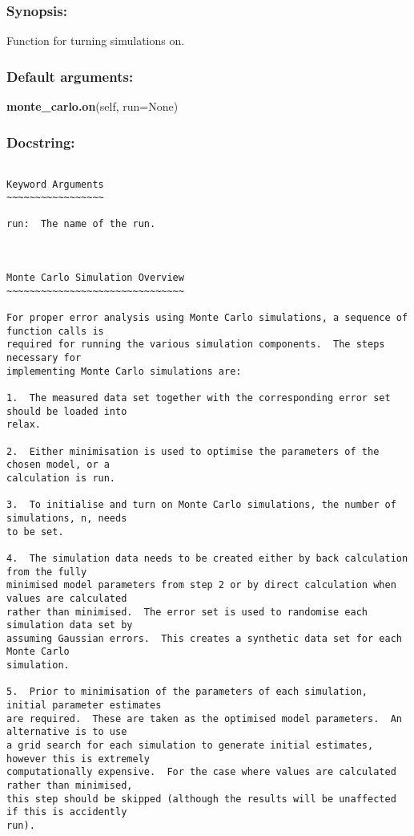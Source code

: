 \subsubsection{Synopsis:}

Function for turning simulations on.

\subsubsection{Default arguments:}

\textsf{\textbf{monte\_carlo.on}(self, run=None)
}


\subsubsection{Docstring:}

{\scriptsize
\begin{verbatim}

Keyword Arguments
~~~~~~~~~~~~~~~~~

run:  The name of the run.



Monte Carlo Simulation Overview
~~~~~~~~~~~~~~~~~~~~~~~~~~~~~~~

For proper error analysis using Monte Carlo simulations, a sequence of function calls is
required for running the various simulation components.  The steps necessary for
implementing Monte Carlo simulations are:

1.  The measured data set together with the corresponding error set should be loaded into
relax.

2.  Either minimisation is used to optimise the parameters of the chosen model, or a
calculation is run.

3.  To initialise and turn on Monte Carlo simulations, the number of simulations, n, needs
to be set.

4.  The simulation data needs to be created either by back calculation from the fully
minimised model parameters from step 2 or by direct calculation when values are calculated
rather than minimised.  The error set is used to randomise each simulation data set by
assuming Gaussian errors.  This creates a synthetic data set for each Monte Carlo
simulation.

5.  Prior to minimisation of the parameters of each simulation, initial parameter estimates
are required.  These are taken as the optimised model parameters.  An alternative is to use
a grid search for each simulation to generate initial estimates, however this is extremely
computationally expensive.  For the case where values are calculated rather than minimised,
this step should be skipped (although the results will be unaffected if this is accidently
run).


\end{verbatim}}
